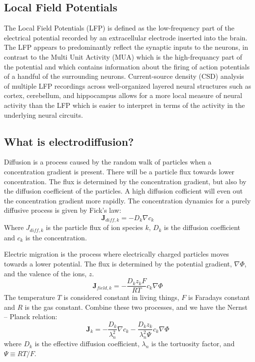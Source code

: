 \documentclass{article}
\begin{document}
\subsection{Local Field Potentials}
The Local Field Potentials (LFP) is defined as the low-frequency part of the electrical potential recorded by an extracellular electrode
inserted into the brain. The LFP appears to predominantly reflect the synaptic inputs to the neurons, in contrast to the Multi Unit Activity (MUA) which is the high-frequancy part of the potential and  which contains information about the firing of action potentials of a handful of the
surrounding neurons.  Current-source density (CSD) analysis of multiple LFP recordings across well-organized
layered neural structures such as cortex, cerebellum, and hippocampus allows for a more local measure of neural activity than the LFP which is easier to interpret in terms of the activity in the underlying neural circuits.
\subsection{What is electrodiffusion?}

Diffusion is a process caused by the random walk of particles when a concentration gradient is present. There will be a particle flux towards lower concentration. The flux is determined by the concentration gradient, but also by the diffusion coefficient of the particles. A high diffusion cofficient will even out the concentration gradient more rapidly. The concentration dynamics for a purely diffusive process is given by Fick's law:
\begin{equation}\label{eq:diff}
 \bm{J}_{diff,k} = - D_k\nabla c_k
\end{equation}
Where  $J_{diff,k}$ is the particle flux of ion species $k$, $D_k$ is the diffusion coefficient and $c_k$ is the concentration.

Electric migration is the process where electrically charged particles moves towards a lower potential. The flux is determined by the potential gradient, $\nabla \Phi$,  and the valence of the ions, $z$. 
\begin{equation}
\bm{J}_{field,k} = -\frac{D_kz_kF}{RT} c_k\nabla \Phi
\end{equation}
The temperature $T$ is considered constant in living things, $F$ is Faradays constant and $R$ is the gas constant. Combine these two processes, and we have the Nernst -- Planck relation:
 \begin{equation}\label{eq:nernst-planck}
\bm{J}_k = -\frac{D_k}{\lambda_n^2}\nabla c_k -\frac{D_k z_k}{\lambda_n^2 \Psi}c_k  \nabla \Phi
\end{equation}
where $D_k$ is the effective diffusion coefficient, $\lambda_n$ is the tortuosity factor, and $\Psi \equiv RT/F$.
\end{document}

